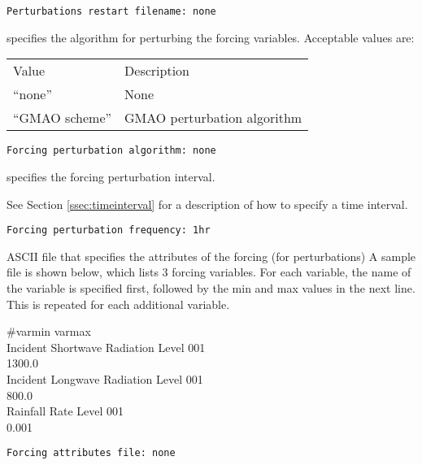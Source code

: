  \begin{Verbatim}[frame=single]
Perturbations restart filename: none
 \end{Verbatim}

  specifies the algorithm for
 perturbing the forcing variables.
 Acceptable values are: 

 \begin{tabular}{ll}
 Value           & Description                 \\
 ``none''        & None                        \\
 ``GMAO scheme'' & GMAO perturbation algorithm \\
 \end{tabular}
 

 \begin{Verbatim}[frame=single]
Forcing perturbation algorithm: none
 \end{Verbatim}

 
  specifies the forcing
 perturbation interval.

 See Section \ref{ssec:timeinterval} for a description
 of how to specify a time interval.
 

 \begin{Verbatim}[frame=single]
Forcing perturbation frequency: 1hr
 \end{Verbatim}

 
  ASCII file that
 specifies the attributes of the forcing (for perturbations)
 A sample file is shown below, which lists 3 forcing 
 variables. For each variable, the name of the variable is 
 specified first, followed by the min and max values in the 
 next line. This is repeated for each additional variable.  

   \#varmin  varmax                       \\
   \indent Incident Shortwave Radiation Level 001 \\
         1300.0                        \\
   \indent Incident Longwave Radiation Level 001  \\
       800.0                         \\
   \indent Rainfall Rate Level 001                \\
         0.001
 

 \begin{Verbatim}[frame=single]
Forcing attributes file: none
 \end{Verbatim}

